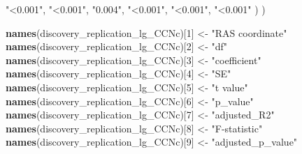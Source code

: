 \documentclass[
]{article}
\newenvironment{Shaded}{\begin{snugshade}}{\end{snugshade}}
\newcommand{\DecValTok}[1]{\textcolor[rgb]{0.00,0.00,0.81}{#1}}
\newcommand{\KeywordTok}[1]{\textcolor[rgb]{0.13,0.29,0.53}{\textbf{#1}}}
\newcommand{\NormalTok}[1]{#1}
\newcommand{\StringTok}[1]{\textcolor[rgb]{0.31,0.60,0.02}{#1}}
\begin{document}
\begin{Shaded}
\begin{Highlighting}[]
                                        \StringTok{"<0.001"}\NormalTok{, }\StringTok{"<0.001"}\NormalTok{, }\StringTok{"0.004"}\NormalTok{, }\StringTok{"<0.001"}\NormalTok{, }\StringTok{"<0.001"}\NormalTok{, }\StringTok{"<0.001"}
\NormalTok{                                        )}
\NormalTok{                )}

\KeywordTok{names}\NormalTok{(discovery_replication_lg_CCNc)[}\DecValTok{1}\NormalTok{] <-}\StringTok{ "RAS coordinate"}
\KeywordTok{names}\NormalTok{(discovery_replication_lg_CCNc)[}\DecValTok{2}\NormalTok{] <-}\StringTok{ "df"}
\KeywordTok{names}\NormalTok{(discovery_replication_lg_CCNc)[}\DecValTok{3}\NormalTok{] <-}\StringTok{ "coefficient"}
\KeywordTok{names}\NormalTok{(discovery_replication_lg_CCNc)[}\DecValTok{4}\NormalTok{] <-}\StringTok{ "SE"}
\KeywordTok{names}\NormalTok{(discovery_replication_lg_CCNc)[}\DecValTok{5}\NormalTok{] <-}\StringTok{ "t value"}
\KeywordTok{names}\NormalTok{(discovery_replication_lg_CCNc)[}\DecValTok{6}\NormalTok{] <-}\StringTok{ "p_value"}
\KeywordTok{names}\NormalTok{(discovery_replication_lg_CCNc)[}\DecValTok{7}\NormalTok{] <-}\StringTok{ "adjusted_R2"}
\KeywordTok{names}\NormalTok{(discovery_replication_lg_CCNc)[}\DecValTok{8}\NormalTok{] <-}\StringTok{ "F-statistic"}
\KeywordTok{names}\NormalTok{(discovery_replication_lg_CCNc)[}\DecValTok{9}\NormalTok{] <-}\StringTok{ "adjusted_p_value"}


\end{Highlighting}
\end{Shaded}
\end{document}
